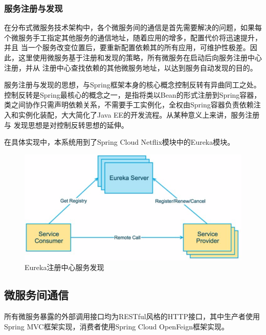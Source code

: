 \documentclass[titlepage,UTF8,linespread=1.5]{ctexart}
\begin{document}
\subsubsection{服务注册与发现}
在分布式微服务技术架构中，各个微服务间的通信是首先需要解决的问题，如果每个微服务手工指定其他服务的通信地址，随着应用的增多，配置代价将迅速提升，并且
当一个服务改变位置后，要重新配置依赖其的所有应用，可维护性极差。因此，这里使用微服务基于注册和发现的策略，所有微服务在启动后向服务注册中心注册，并从
注册中心查找依赖的其他微服务地址，以达到服务自动发现的目的。\par
服务注册与发现的思想，与Spring框架本身的核心概念控制反转有异曲同工之处。控制反转是Spring最核心的概念之一，是指将类以Bean的形式注册到Spring容器，
类之间协作只需声明依赖关系，不需要手工实例化，全权由Spring容器负责依赖注入和实例化装配，大大简化了Java EE的开发流程。从某种意义上来讲，服务注册与
发现思想是对控制反转思想的延伸。\par
在具体实现中，本系统用到了Spring Cloud Netflix模块中的Eureka模块。\par
\begin{figure}[H]
    \centering
    \includegraphics[width=130mm]{struct-eureka.png}
    \caption{Eureka注册中心服务发现}
    \label{fig:struct-eureka}
\end{figure}

\subsection{微服务间通信}
所有微服务暴露的外部调用接口均为RESTful风格的HTTP接口，其中生产者使用Spring MVC框架实现，消费者使用Spring Cloud OpenFeign框架实现。\par
\end{document}
